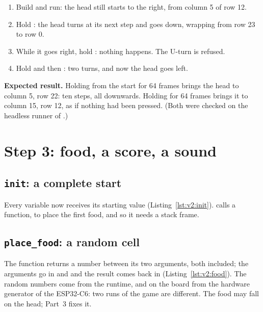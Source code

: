 \begin{prgcheck}
\begin{enumerate}[nosep]
\item Build and run: the head still starts to the right, from column 5 of
  row 12.
\item Hold : the head turns at its next step and goes down, wrapping
  from row 23 to row 0.
\item While it goes right, hold : nothing happens. The U-turn is
  refused.
\item Hold  and then : two turns, and now the head goes
  left.
\end{enumerate}
\textbf{Expected result.} Holding  from the start for 64 frames
brings the head to column 5, row 22: ten steps, all downwards. Holding
 for 64 frames brings it to column 15, row 12, as if nothing had
been pressed. (Both were checked on the headless runner of \prgqt.)
\end{prgcheck}

\section{Step 3: food, a score, a sound}

\subsection{\texttt{init}: a complete start}


Every variable now receives its starting value
(Listing~\ref{lst:v2:init}).  calls a function, to place the first
food, and so it needs a stack frame.

\subsection{\texttt{place\_food}: a random cell}


The function  returns a number between
its two arguments, both included; the arguments go in  and 
and the result comes back in  (Listing~\ref{lst:v2:food}). The random
numbers come from the runtime, and on the board from the hardware generator of
the ESP32-C6: two runs of the game are different. The food may fall on the
head; Part~3 fixes it.

